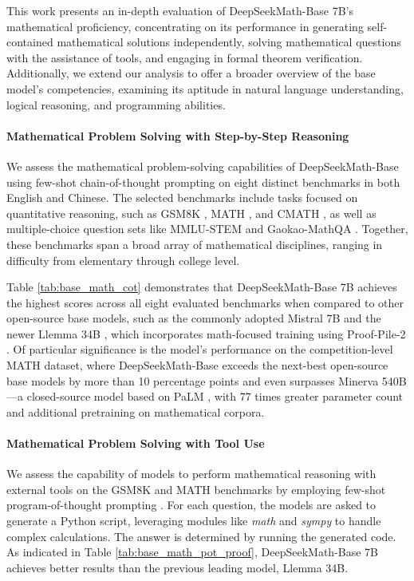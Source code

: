 \begin{itemize}[topsep=0pt]
This work presents an in-depth evaluation of DeepSeekMath-Base 7B's mathematical proficiency, concentrating on its performance in generating self-contained mathematical solutions independently, solving mathematical questions with the assistance of tools, and engaging in formal theorem verification. Additionally, we extend our analysis to offer a broader overview of the base model’s competencies, examining its aptitude in natural language understanding, logical reasoning, and programming abilities.

\paragraph{Mathematical Problem Solving with Step-by-Step Reasoning}

We assess the mathematical problem-solving capabilities of DeepSeekMath-Base using few-shot chain-of-thought prompting \citep{cot} on eight distinct benchmarks in both English and Chinese. The selected benchmarks include tasks focused on quantitative reasoning, such as GSM8K \citep{gsm8k}, MATH \citep{MATH}, and CMATH \citep{wei2023cmath}, as well as multiple-choice question sets like MMLU-STEM \citep{mmlu} and Gaokao-MathQA \citep{agieval}. Together, these benchmarks span a broad array of mathematical disciplines, ranging in difficulty from elementary through college level.

Table \ref{tab:base_math_cot} demonstrates that DeepSeekMath-Base 7B achieves the highest scores across all eight evaluated benchmarks when compared to other open-source base models, such as the commonly adopted Mistral 7B \citep{mistral} and the newer Llemma 34B \citep{llemma}, which incorporates math-focused training using Proof-Pile-2 \citep{llemma}. Of particular significance is the model's performance on the competition-level MATH dataset, where DeepSeekMath-Base exceeds the next-best open-source base models by more than 10 percentage points and even surpasses Minerva 540B \citep{minerva}—a closed-source model based on PaLM \citep{palm}, with 77 times greater parameter count and additional pretraining on mathematical corpora.

\paragraph{Mathematical Problem Solving with Tool Use} We assess the capability of models to perform mathematical reasoning with external tools on the GSM8K and MATH benchmarks by employing few-shot program-of-thought prompting \citep{pot,pal}. For each question, the models are asked to generate a Python script, leveraging modules like \textit{math} and \textit{sympy} to handle complex calculations. The answer is determined by running the generated code. As indicated in Table \ref{tab:base_math_pot_proof}, DeepSeekMath-Base 7B achieves better results than the previous leading model, Llemma 34B.


\end{itemize}
